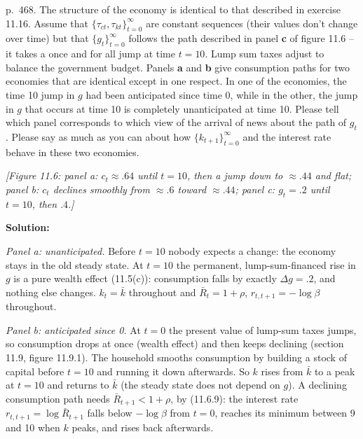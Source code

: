 \documentclass[12pt, letterpaper]{article}
\newcommand{\Rb}{\bar R}
\newcommand{\kb}{\bar k}
\begin{document}
\begin{tcolorbox}[oddbox,title={Exercise 11.17 \quad Anticipated vs unanticipated jump in $g$}]
\begin{tcolorbox}[questionbox]
p.~468. The structure of the economy is identical to that described in exercise 11.16. Assume that
$\{\tau_{ct},\tau_{kt}\}_{t=0}^\infty$ are constant sequences (their values don't change over time) but that
$\{g_t\}_{t=0}^\infty$ follows the path described in panel \textbf{c} of figure 11.6 -- it takes a once and for all jump
at time $t=10$. Lump sum taxes adjust to balance the government budget. Panels \textbf{a} and \textbf{b} give consumption
paths for two economies that are identical except in one respect. In one of the economies, the time 10 jump in $g$ had
been anticipated since time 0, while in the other, the jump in $g$ that occurs at time 10 is completely unanticipated at
time 10. Please tell which panel corresponds to which view of the arrival of news about the path of $g_t$. Please say as
much as you can about how $\{k_{t+1}\}_{t=0}^\infty$ and the interest rate behave in these two economies.

\smallskip
\emph{[Figure 11.6: panel a: $c_t\approx.64$ until $t=10$, then a jump down to $\approx.44$ and flat; panel b: $c_t$
declines smoothly from $\approx.6$ toward $\approx.44$; panel c: $g_t=.2$ until $t=10$, then $.4$.]}
\end{tcolorbox}

\textbf{Solution:}

\emph{Panel a: unanticipated.} Before $t=10$ nobody expects a change: the economy stays in the old steady state. At
$t=10$ the permanent, lump-sum-financed rise in $g$ is a pure wealth effect (11.5(c)): consumption falls by exactly
$\Delta g=.2$, and nothing else changes. $k_t=\kb$ throughout and $\Rb_t=1+\rho$, $r_{t,t+1}=-\log\beta$ throughout.

\emph{Panel b: anticipated since 0.} At $t=0$ the present value of lump-sum taxes jumps, so consumption drops at once
(wealth effect) and then keeps declining (section 11.9, figure 11.9.1). The household smooths consumption by building a
stock of capital before $t=10$ and running it down afterwards. So $k$ rises from $\kb$ to a peak at $t=10$ and returns to
$\kb$ (the steady state does not depend on $g$). A declining consumption path needs $\Rb_{t+1}<1+\rho$, by (11.6.9): the
interest rate $r_{t,t+1}=\log\Rb_{t+1}$ falls below $-\log\beta$ from $t=0$, reaches its minimum between 9 and 10 when
$k$ peaks, and rises back afterwards.


\end{tcolorbox}
\end{document}

